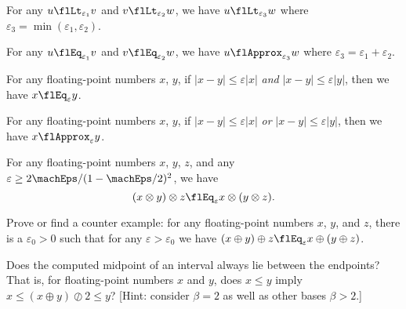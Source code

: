 \begin{thm}
  For any $u\flLt_{\varepsilon_{1}}v$ and $v\flLt_{\varepsilon_{2}}w$,
  we have $u\flLt_{\varepsilon_{3}}w$ where $\varepsilon_{3}=\min(\varepsilon_{1},\varepsilon_{2})$.
\end{thm}
\begin{thm}
  For any $u\flEq_{\varepsilon_{1}}v$ and $v\flEq_{\varepsilon_{2}}w$,
  we have $u\flApprox_{\varepsilon_{3}}w$ where $\varepsilon_{3}=\varepsilon_{1}+\varepsilon_{2}$.
\end{thm}
\begin{thm}
  For any floating-point numbers $x$, $y$, if $|x-y|\leq\varepsilon|x|$
  \emph{and} $|x-y|\leq\varepsilon|y|$, then we have $x\flEq_{\varepsilon}y$.
\end{thm}
\begin{thm}
  For any floating-point numbers $x$, $y$, if $|x-y|\leq\varepsilon|x|$
  \emph{or} $|x-y|\leq\varepsilon|y|$, then we have $x\flApprox_{\varepsilon}y$.
\end{thm}


\begin{thm}
  For any floating-point numbers $x$, $y$, $z$, and any
  $\varepsilon\geq 2\machEps/(1 - \machEps/2)^{2}$, we have
  \begin{equation}
    (x\otimes y)\otimes z\flEq_{\varepsilon}x\otimes(y\otimes z).
  \end{equation}
\end{thm}

\begin{xca}
  Prove or find a counter example: for any floating-point numbers $x$,
  $y$, and $z$, there is a $\varepsilon_{0}>0$ such that for any
  $\varepsilon>\varepsilon_{0}$ we have $(x\oplus y)\oplus z\flEq_{\varepsilon}x\oplus(y\oplus z)$.
\end{xca}

\begin{xca}
  Does the computed midpoint of an interval always lie between the
  endpoints? That is, for floating-point numbers $x$ and $y$, does
  $x\leq y$ imply $x\leq (x\oplus y)\oslash 2\leq y$? [Hint: consider
    $\beta=2$ as well as other bases $\beta>2$.]
\end{xca}

